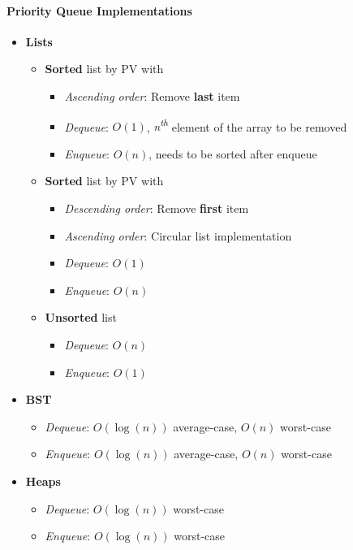 \documentclass[10pt, 
a4paper, 
oneside, 
headinclude, footinclude, 
BCOR5mm]
{scrartcl}
\begin{document}
\paragraph{\textbf{Priority Queue Implementations}}
\begin{itemize}
    \item \textbf{Lists}
    \begin{itemize}
        \item \textbf{Sorted} list by PV with 
        \begin{itemize}
            \item \textit{Ascending order}: Remove \textbf{last} item
            \item \textit{Dequeue}: $O(1)$, \textit{n\textsuperscript{th}} element of the array to be removed
            \item \textit{Enqueue}: $O(n)$, needs to be sorted after enqueue
        \end{itemize}
        \item \textbf{Sorted} list by PV with  
        \begin{itemize}
            \item \textit{Descending order}: Remove \textbf{first} item
            \item \textit{Ascending order}: Circular list implementation
            \item \textit{Dequeue}: $O(1)$
            \item \textit{Enqueue}: $O(n)$
        \end{itemize}
        \item \textbf{Unsorted} list
        \begin{itemize}
            \item \textit{Dequeue}: $O(n)$
            \item \textit{Enqueue}: $O(1)$
        \end{itemize}
    \end{itemize}
    \item \textbf{BST}
    \begin{itemize}
        \item \textit{Dequeue}: $O(\log(n))$ average-case, $O(n)$ worst-case 
        \item \textit{Enqueue}: $O(\log(n))$ average-case, $O(n)$ worst-case 
    \end{itemize}
    \item \textbf{Heaps}
    \begin{itemize}
        \item \textit{Dequeue}: $O(\log(n))$ worst-case 
        \item \textit{Enqueue}: $O(\log(n))$ worst-case 
    \end{itemize}
\end{itemize}
\newpage
\end{document}
